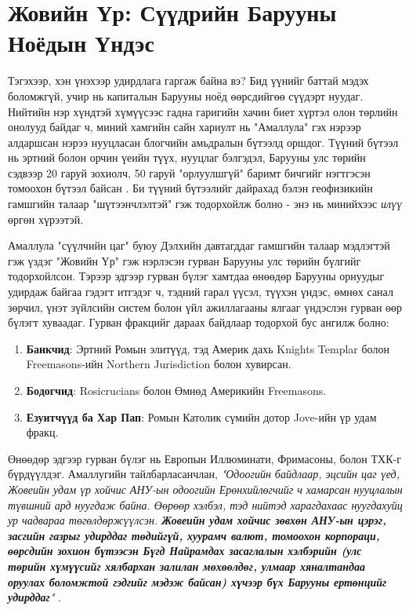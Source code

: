 \documentclass[10pt,twocolumn,letterpaper]{article}
\begin{document}
\section{Жовийн Үр: Сүүдрийн Барууны Ноёдын Үндэс}

Тэгэхээр, хэн үнэхээр удирдлага гаргаж байна вэ? Бид үүнийг баттай мэдэх боломжгүй, учир нь капиталын Барууны ноёд өөрсдийгөө сүүдэрт нуудаг. Нийтийн нэр хүндтэй хүмүүсээс гадна гаригийн хачин биет хүртэл олон төрлийн онолууд байдаг ч, миний хамгийн сайн хариулт нь "Амаллула" гэх нэрээр алдаршсан нэрээ нууцласан блогчийн амьдралын бүтээлд оршдог. Түүний бүтээл нь эртний болон орчин үеийн түүх, нууцлаг бэлгэдэл, Барууны улс төрийн сэдвээр 20 гаруй зохиолч, 50 гаруй "орлуулшгүй" баримт бичгийг нэгтгэсэн томоохон бүтээл байсан \cite{33,34}. Би түүний бүтээлийг дайрахад бэлэн геофизикийн гамшгийн талаар "шүтээнчлэлтэй" гэж тодорхойлж болно - энэ нь минийхээс \textit{илүү} өргөн хүрээтэй.

Амаллула "сүүлчийн цаг" буюу Дэлхийн давтагддаг гамшгийн талаар мэдлэгтэй гэж үздэг "Жовийн Үр" гэж нэрлэсэн гурван Барууны улс төрийн бүлгийг тодорхойлсон. Тэрээр эдгээр гурван бүлэг хамтдаа өнөөдөр Барууны орнуудыг удирдаж байгаа гэдэгт итгэдэг ч, тэдний гарал үүсэл, түүхэн үндэс, өмнөх санал зөрчил, үнэт зүйлсийн систем болон үйл ажиллагааны ялгааг үндэслэн гурван өөр бүлэгт хуваадаг.
Гурван фракцийг дараах байдлаар тодорхой бус ангилж болно:

\begin{flushleft}
\begin{enumerate}
    \item \textbf{Банкчид}: Эртний Ромын элитүүд, тэд Америк дахь Knights Templar болон Freemasons-ийн Northern Jurisdiction болон хувирсан.
    \item \textbf{Бодогчид}: Rosicrucians болон Өмнөд Америкийн Freemasons.
    \item \textbf{Езуитчүүд ба Хар Пап}: Ромын Католик сүмийн дотор Jove-ийн үр удам фракц.
\end{enumerate}
\end{flushleft}
Өнөөдөр эдгээр гурван бүлэг нь Европын Иллюминати, Фримасоны, болон ТХК-г бүрдүүлдэг. Амаллугийн тайлбарласанчлан, \textit{"Одоогийн байдлаар, эцсийн цаг үед, Жовеийн удам үр хойчис АНУ-ын одоогийн Ерөнхийлөгчийг ч хамарсан нууцлалын түвшний ард нуугдаж байна. Өөрөөр хэлбэл, тэд нийтэд харагдахаас нуугдахуйц ур чадвараа төгөлдөржүүлсэн. \textbf{Жовеийн удам хойчис зөвхөн АНУ-ын цэрэг, засгийн газрыг удирддаг төдийгүй, хуурамч валют, томоохон корпораци, өөрсдийн зохион бүтээсэн Бүгд Найрамдах засаглалын хэлбэрийн (улс төрийн хүмүүсийг хялбархан залилан мөхөөлдөг, улмаар хяналтандаа оруулах боломжтой гэдгийг мэдэж байсан) хүчээр бүх Барууны ертөнцийг удирддаг}"} \cite{33,34}.
\end{document}
